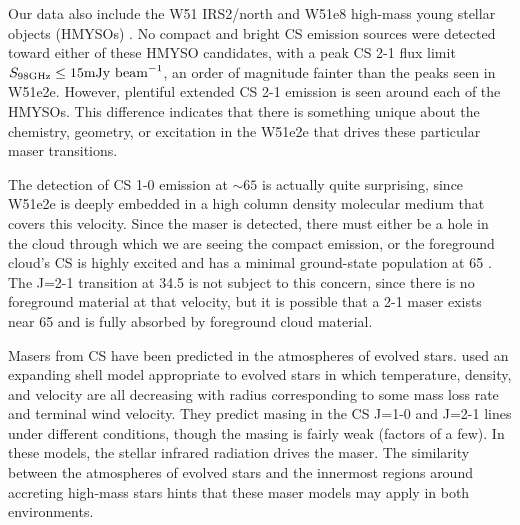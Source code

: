 \documentclass[twocolumn]{aastex62}
\begin{document}
Our data also include the W51 IRS2/north and W51e8 high-mass young stellar
objects (HMYSOs) \citep{Ginsburg2017a}.  No compact and bright CS emission
sources were detected
toward either of these HMYSO candidates, with a peak CS 2-1 flux limit ${S_{98
\mathrm{GHz}} \leq 15 \mathrm{mJy~\textrm{beam}^{-1}}}$, an order of magnitude fainter
than the peaks seen in W51e2e.  However, plentiful extended CS 2-1 emission is
seen around each of the HMYSOs.  This difference indicates that there is
something unique about the chemistry, geometry, or excitation in the W51e2e
that drives these particular maser transitions.

The detection of CS 1-0 emission at $\sim65$ \kms is actually quite surprising,
since W51e2e is deeply embedded in a high column density molecular medium that
covers this velocity.  
Since the maser is detected, there must either be a hole
in the cloud through which we are seeing the compact emission, or the
foreground cloud's CS
is highly excited and has a minimal ground-state population at 65 \kms. 
The J=2-1 transition at 34.5 \kms is not
subject to this concern, since there is no foreground material at that
velocity, but it is possible that a 2-1 maser exists near 65 \kms and is fully
absorbed by foreground cloud material.


Masers from CS have been predicted in the atmospheres of evolved stars.
\citet{Schoenberg1988a}
used an expanding shell model appropriate to evolved stars in which
temperature, density, and velocity are all decreasing with radius corresponding
to some mass loss rate and terminal wind velocity. They predict masing in the
CS J=1-0 and J=2-1 lines under different conditions, though the masing is
fairly weak (factors of a few).  In these models, the stellar infrared
radiation drives the maser.  The similarity between the atmospheres
of evolved stars and the innermost regions around accreting high-mass stars
hints that these maser models may apply in both environments.

\end{document}
